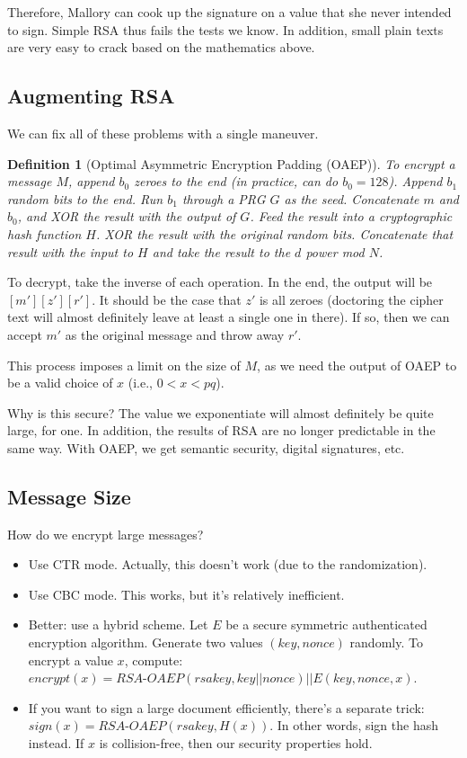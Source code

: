 \documentclass[12pt]{article}
\newtheorem*{mydef}{Definition}
\begin{document}
Therefore, Mallory can cook up the signature on a value that she never intended to sign. Simple RSA thus fails the tests we know. In addition, small plain texts are very easy to crack based on the mathematics above.

\subsection*{Augmenting RSA}

We can fix all of these problems with a single maneuver.

\begin{mydef}[Optimal Asymmetric Encryption Padding (OAEP)]
To encrypt a message $M$, append $b_0$ zeroes to the end (in practice, can do $b_0 = 128$). Append $b_1$ random bits to the end. Run $b_1$ through a PRG $G$ as the seed. Concatenate $m$ and $b_0$, and XOR the result with the output of $G$. Feed the result into a cryptographic hash function $H$. XOR the result with the original random bits. Concatenate that result with the input to $H$ and take the result to the $d$ power mod $N$.
\end{mydef}

To decrypt, take the inverse of each operation. In the end, the output will be $[m'][z'][r']$. It should be the case that $z'$ is all zeroes (doctoring the cipher text will almost definitely leave at least a single one in there). If so, then we can accept $m'$ as the original message and throw away $r'$.

This process imposes a limit on the size of $M$, as we need the output of OAEP to be a valid choice of $x$ (i.e., $0 < x < pq$).

Why is this secure? The value we exponentiate will almost definitely be quite large, for one. In addition, the results of RSA are no longer predictable in the same way. With OAEP, we get semantic security, digital signatures, etc.

\subsection*{Message Size}

How do we encrypt large messages?

\begin{itemize}
\item Use CTR mode. Actually, this doesn't work (due to the randomization).
\item Use CBC mode. This works, but it's relatively inefficient.
\item Better: use a hybrid scheme. Let $E$ be a secure symmetric authenticated encryption algorithm. Generate two values $(key, nonce)$ randomly. To encrypt a value $x$, compute: $encrypt(x) = RSA\text{-}OAEP(rsakey, key||nonce) || E(key, nonce, x)$.
\item If you want to sign a large document efficiently, there's a separate trick: $sign(x) = RSA\text{-}OAEP(rsakey, H(x))$. In other words, sign the hash instead. If $x$ is collision-free, then our security properties hold.
\end{itemize}
\end{document}
